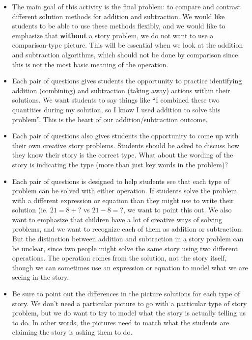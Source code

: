 \documentclass{ximera}
\begin{document}
\begin{instructorNotes}
\begin{itemize}
	\item The main goal of this activity is the final problem: to compare and contrast different solution methods for addition and subtraction. We would like students to be able to use these methods flexibly, and we would like to emphasize that {\bf without} a story problem, we do not want to use a comparison-type picture. This will be essential when we look at the addition and subtraction algorithms, which should not be done by comparison since this is not the most basic meaning of the operation. 
	\item Each pair of questions gives students the opportunity to practice identifying addition (combining) and subtraction (taking away) actions within their solutions. We want students to say things like ``I combined these two quantities during my solution, so I know I used addition to solve this problem''. This is the heart of our addition/subtraction outcome.
	\item Each pair of questions also gives students the opportunity to come up with their own creative story problems. Students should be asked to discuss how they know their story is the correct type. What about the wording of the story is indicating the type (more than just key words in the problem)?
	\item Each pair of questions is designed to help students see that each type of problem can be solved with either operation. If students solve the problem with a different expression or equation than they might use to write their solution (ie. $21 = 8 + ?$ vs $21-8 = ?$, we want to point this out. We also want to emphasize that children have a lot of creative ways of solving problems, and we want to recognize each of them as addition or subtraction. But the distinction between addition and subtraction in a story problem can be unclear, since two people might solve the same story using two different operations. The operation comes from the solution, not the story itself, though we can sometimes use an expression or equation to model what we are seeing in the story.
	\item Be sure to point out the differences in the picture solutions for each type of story. We don't need a particular picture to go with a particular type of story problem, but we do want to try to model what the story is actually telling us to do. In other words, the pictures need to match what the students are claiming the story is asking them to do.
\end{itemize}


\end{instructorNotes}
\end{document}
